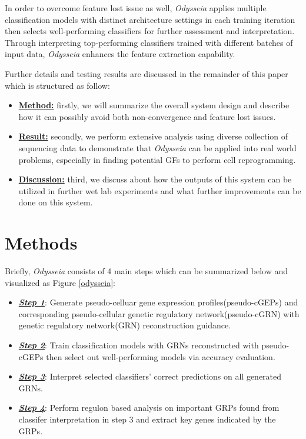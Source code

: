 \documentclass[fleqn,10pt]{wlscirep}
\begin{document}
In order to overcome feature lost issue as well, \emph{Odysseia} applies multiple classification models with distinct architecture settings in each training iteration then selects well-performing classifiers for further assessment and interpretation.
Through interpreting top-performing classifiers trained with different batches of input data, \emph{Odysseia} enhances the feature extraction capability.

Further details and testing results are discussed in the remainder of this paper which is structured as follow:
\begin{itemize}
\setlength\itemsep{0em}
\item{\hyperref[method]{\textbf{Method:}}}
    firstly, we will summarize the overall system design and describe how it can possibly avoid both non-convergence and feature lost issues.
\item {\hyperref[res]{\textbf{Result:}}}
    secondly, we perform extensive analysis using diverse collection of sequencing data to demonstrate that \emph{Odysseia} can be applied into real world problems, especially in finding potential GFs to perform cell reprogramming.
\item {\hyperref[disc]{\textbf{Discussion:}}}
    third, we discuss about how the outputs of this system can be utilized in further wet lab experiments and what further improvements can be done on this system.
\end{itemize}

\section*{Methods}
\label{method}
Briefly, \emph{Odysseia} consists of 4 main steps which can be summarized below and visualized as Figure \ref{odysseia}:
\begin{itemize}
  \item \hyperref[step1]{\textbf{\emph{Step 1}}}: Generate pseudo-celluar gene expression profiles(pseudo-cGEPs) and corresponding pseudo-cellular genetic regulatory network(pseudo-cGRN) with genetic regulatory network(GRN) reconstruction guidance.
  \item \hyperref[step2]{\textbf{\emph{Step 2}}}: Train classification models with GRNs reconstructed with pseudo-cGEPs then select out well-performing models via accuracy evaluation.
  \item \hyperref[step3]{\textbf{\emph{Step 3}}}: Interpret selected classifiers' correct predictions on all generated GRNs.
  \item \hyperref[step4]{\textbf{\emph{Step 4}}}: Perform regulon based analysis on important GRPs found from classifer interpretation in step 3 and extract key genes indicated by the GRPs.
\end{itemize}
\end{document}
